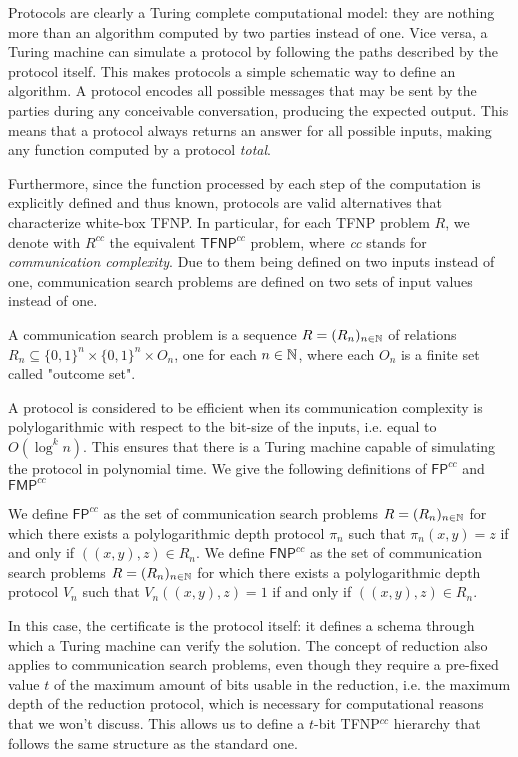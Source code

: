 Protocols are clearly a Turing complete computational model: they are nothing more than an algorithm computed by two parties instead of one. Vice versa, a Turing machine can simulate a protocol by following the paths described by the protocol itself. This makes protocols a simple schematic way to define an algorithm. A protocol encodes all possible messages that may be sent by the parties during any conceivable conversation, producing the expected output. This means that a protocol always returns an answer for all possible inputs, making any function computed by a protocol \textit{total}. 

Furthermore, since the function processed by each step of the computation is explicitly defined and thus known, protocols are valid alternatives that characterize white-box \textsf{TFNP}. In particular, for each \textsf{TFNP} problem $R$, we denote with $R^{cc}$ the equivalent $\mathsf{TFNP}^{cc}$ problem, where \textit{cc} stands for \textit{communication complexity}. Due to them being defined on two inputs instead of one, communication search problems are defined on two sets of input values instead of one.

\begin{definition}
 A communication search problem is a sequence $R = (R_n)_{n \in \mathbb{N}}$ of relations $R_n \subseteq \{0,1\}^n \times \{0,1\}^n \times O_n$, one for each $n \in \mathbb{N}$, where each $O_n$ is a finite set called "outcome set".
\end{definition}

A protocol is considered to be efficient when its communication complexity is polylogarithmic with respect to the bit-size of the inputs, i.e. equal to $O(\log^k n)$. This ensures that there is a Turing machine capable of simulating the protocol in polynomial time. We give the following definitions of $\mathsf{FP}^{cc}$ and $\mathsf{FMP}^{cc}$

\begin{definition}
 We define $\mathsf{FP}^{cc}$ as the set of communication search problems $R = (R_n)_{n \in \mathbb{N}}$ for which there exists a polylogarithmic depth protocol $\pi_n$ such that $\pi_n(x,y) = z$ if and only if $((x,y), z) \in R_n$.
    \newpage
 We define $\mathsf{FNP}^{cc}$ as the set of communication search problems $R = (R_n)_{n \in \mathbb{N}}$ for which there exists a polylogarithmic depth protocol $V_n$ such that $V_n((x,y), z) = 1$ if and only if $((x,y), z) \in R_n$. 
\end{definition}

In this case, the certificate is the protocol itself: it defines a schema through which a Turing machine can verify the solution. The concept of reduction also applies to communication search problems, even though they require a pre-fixed value $t$ of the maximum amount of bits usable in the reduction, i.e. the maximum depth of the reduction protocol, which is necessary for computational reasons that we won't discuss. This allows us to define a $t$-bit \textsf{TFNP}$^{cc}$ hierarchy that follows the same structure as the standard one.

